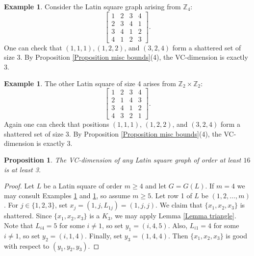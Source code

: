 \documentclass{article}
\newtheorem{prop}[thm]{Proposition}
\theoremstyle{definition}
\newtheorem{eg}[thm]{Example}
\begin{document}
\begin{eg} \label{Example LS 1}
    Consider the Latin square graph arising from $\mathbb Z_4$:
    $$\begin{bmatrix}
        1&2&3&4\\
        2&3&4&1\\
        3&4&1&2\\
        4&1&2&3
    \end{bmatrix}.$$
    One can check that $(1,1,1),(1,2,2)$, and $(3,2,4)$ form a shattered set of size 3. By Proposition \ref{Proposition misc bounds}(4), the VC-dimension is exactly 3.
\end{eg}

\begin{eg} \label{Example LS 2}
    The other Latin square of size 4 arises from $\mathbb Z_2\times\mathbb Z_2$:
    $$\begin{bmatrix}
        1&2&3&4\\
        2&1&4&3\\
        3&4&1&2\\
        4&3&2&1
    \end{bmatrix}.$$
    Again one can check that positions $(1,1,1)$, $(1,2,2)$, and $(3,2,4)$ form a shattered set of size 3. By Proposition \ref{Proposition misc bounds}(4), the VC-dimension is exactly 3.
\end{eg}

\begin{prop}
    The VC-dimension of any Latin square graph of order at least $16$ is at least 3.
\end{prop}
\begin{proof}
    Let $L$ be a Latin square of order $m\ge 4$ and let $G=G(L)$. If $m=4$ we may consult Examples \ref{Example LS 1} and \ref{Example LS 2}, so assume $m\ge 5$. Let row 1 of $L$ be $(1,2,\ldots,m)$. For $j\in\{1,2,3\}$, set $x_j=(1,j,L_{1j})=(1,j,j)$. We claim that $\{x_1,x_2,x_3\}$ is shattered. Since $\{x_1,x_2,x_3\}$ is a $K_3$, we may apply Lemma \ref{Lemma triangle}. Note that $L_{i4}=5$ for some $i\ne 1$, so set $y_1=(i,4,5)$. Also, $L_{i1}=4$ for some $i\ne 1$, so set $y_2=(i,1,4)$. Finally, set $y_3=(1,4,4)$. Then $\{x_1,x_2,x_3\}$ is good with respect to $(y_1,y_2,y_3)$.
\end{proof}
\end{document}
